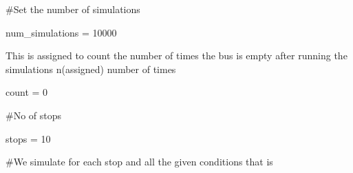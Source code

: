 \documentclass[
]{article}
\author{}
\date{\vspace{-2.5em}}
\newenvironment{Shaded}{\begin{snugshade}}{\end{snugshade}}
\newcommand{\DecValTok}[1]{\textcolor[rgb]{0.00,0.00,0.81}{#1}}
\newcommand{\NormalTok}[1]{#1}
\newcommand{\OtherTok}[1]{\textcolor[rgb]{0.56,0.35,0.01}{#1}}
\begin{document}
\#Set the number of simulations

\begin{Shaded}
\begin{Highlighting}[]
\NormalTok{num\_simulations }\OtherTok{=} \DecValTok{10000}
\end{Highlighting}
\end{Shaded}

This is assigned to count the number of times the bus is empty after
running the simulations n(assigned) number of times

\begin{Shaded}
\begin{Highlighting}[]
\NormalTok{count }\OtherTok{=} \DecValTok{0}
\end{Highlighting}
\end{Shaded}

\#No of stops

\begin{Shaded}
\begin{Highlighting}[]
\NormalTok{stops }\OtherTok{=} \DecValTok{10}
\end{Highlighting}
\end{Shaded}

\#We simulate for each stop and all the given conditions that is
\end{document}
